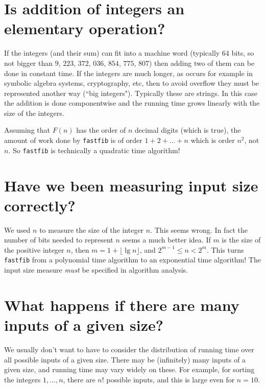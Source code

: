 \section*{Is addition of integers an elementary operation?}

If the integers (and their sum) can fit into a machine word (typically 64 bits, so not bigger than $9$, $223$, $372$, $036$, $854$, $775$, $807$) then 
adding two of them can be done in constant time. If the integers are much longer, as occurs for example in symbolic algebra systems, cryptography, etc, then to avoid overflow they must be represented another way (``big integers"). Typically these are strings. In this case the addition is done componentwise and the running time grows linearly with the size of the integers. 

\begin{Boxample}
Assuming that $F(n)$ has the order of $n$ decimal digits (which is true), the amount of work 
done by \texttt{fastfib} is of order $1+2+\dots + n$ which is order $n^2$, not $n$. 
So \texttt{fastfib} is technically a quadratic time algorithm!
\end{Boxample}


\section*{Have we been measuring input size correctly?}

We used $n$ to measure the size of the integer $n$. This seems wrong. In fact the number of bits needed to represent $n$ seems a much better 
idea. If $m$ is the size of the positive integer $n$, then $m = 1+\lfloor\lg n\rfloor$, and $2^{m-1} \leq n < 2^m$.
This turns \texttt{fastfib} from a polynomial time algorithm to an exponential time algorithm! The input size measure \emph{must} be specified in algorithm analysis.



\section*{What happens if there are many inputs of a given size?}

We usually don't want to have to consider the distribution of
running time over all possible inputs of a given size. There may be (infinitely)
many inputs of a given size, and running time may vary widely on these. 
For example, for sorting the integers $1, \dots, n$, there are $n!$ possible inputs, and this is large even for $n=10$.

